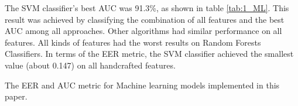 The SVM classifier’s best AUC was 91.3\%, as shown in table \ref{tab:1_ML}. This result was achieved by classifying the combination of all features and the best AUC among all approaches. Other algorithms had similar performance on all features. All kinds of features had the worst results on Random Forests Classifiers. In terms of the EER metric, the SVM classifier achieved the smallest value (about 0.147) on all handcrafted features.














 


\begin{center}
	\begin{table}[!t]
	\centering
	\caption{The EER and AUC metric for Machine learning models implemented in this paper.}
	\label{tab:1_ML}
	
	\end{table}
\end{center}

